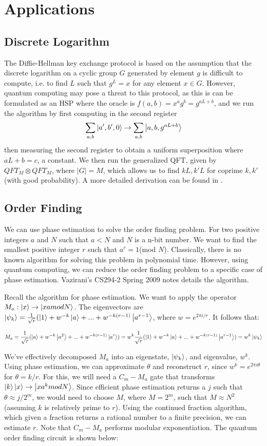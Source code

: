 \documentclass[11pt]{journal}
\begin{document}
\section{Applications}
\subsection{Discrete Logarithm}
The Diffie-Hellman key exchange protocol is based on the assumption that the discrete logarithm on a cyclic group $G$ generated by element $g$ is difficult to compute, i.e. to find $L$ such that $g^L = x$ for any element $x \in G$. However, quantum computing may pose a threat to this protocol, as this is can be formulated as an HSP where the oracle is $f(a,b) = x^ag^b = g^{aL + b}$, and we run the algorithm by first computing in the second register
\[\sum_{a,b}\ket{a',b',0} \rightarrow \sum_{a,b}\ket{a,b,g^{aL + b}}\]
then measuring the second register to obtain a uniform superposition where $aL + b = c$, a constant. We then run the generalized QFT, given by $QFT_M \otimes QFT_M$, where $|G| = M$, which allows us to find $kL, k'L$ for coprime $k,k'$ (with good probability). A more detailed derivation can be found in \cite{mp}. 


\subsection{Order Finding}
We can use phase estimation to solve the order finding problem. For two positive integers $a$ and $N$ such that $a < N$ and $N$ is a n-bit number. We want to find the smallest positive integer $r$ such that $a^r = 1$(mod $N$). Classically, there is no known algorithm for solving this problem in polynomial time. However, using quantum computing, we can reduce the order finding problem to a specific case of phase estimation. Vazirani's CS294-2 Spring 2009 notes \cite{vaz} details the algorithm.

Recall the algorithm for phase estimation. We want to apply the operator $M_a: \ket{x} \rightarrow \ket{xa mod N}$. The eigenvectors are $\ket{\psi_k} = \frac{1}{\sqrt{r}}(\ket{1} + w^{-k}\ket{a} + ... + w^{-k(r-1)}\ket{a^{r-1}}$, where $w = e^{2\pi i/r}$. It follows that:

\[M_a = \frac{1}{\sqrt{r}}(\ket{a} + w^{-k} \ket{a^2} + ... + w^{-k(r-1)}\ket{a^{r}}) = w^k \frac{1}{\sqrt{r}} (\ket{1} + w^{-k}\ket{a} + ... + w^{-k(r-1)}\ket{a^{r-1}}) = w^k \ket{\psi_k}\]

We've effectively decomposed $M_a$ into an eigenstate, $\ket{\psi_k}$, and eigenvalue, $w^k$. Using phase estimation, we can approximate $\theta$ and reconstruct $r$, since $w^k = e^{2\pi i \theta}$ for $\theta = k/r$. For this, we will need a $C_m-M_a$ gate that transforms $\ket{k}\ket{x} \rightarrow \ket{xa^k mod N}$. Since efficient phase estimation returns a $j$ such that $\theta \approx j/2^m$, we would need to choose $M$, where $M = 2^m$, such that $M \approx N^2$ (assuming $k$ is relatively prime to $r$). Using the continued fraction algorithm, which given a fraction returns a rational number to a finite precision, we can estimate $r$. Note that $C_m-M_a$ performs modular exponentiation. The quantum order finding circuit is shown below:
\end{document}
